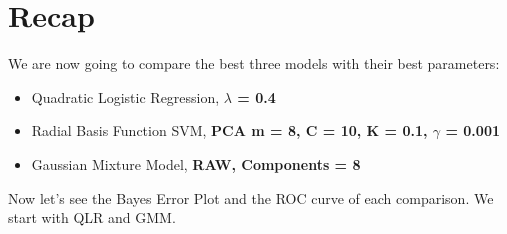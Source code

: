 \documentclass[english]{report}
\begin{document}
\clearpage
\section{Recap}
We are now going to compare the best three models with their best parameters: 
\begin{itemize}
    \item Quadratic Logistic Regression, \textbf{$\lambda$ = 0.4}
    \item Radial Basis Function SVM, \textbf{PCA m = 8, C = 10, K = 0.1, $\gamma$ = 0.001}
    \item Gaussian Mixture Model, \textbf{RAW, Components = 8}
\end{itemize}

Now let's see the Bayes Error Plot and the ROC curve of each comparison.
We start with QLR and GMM.
\end{document}
